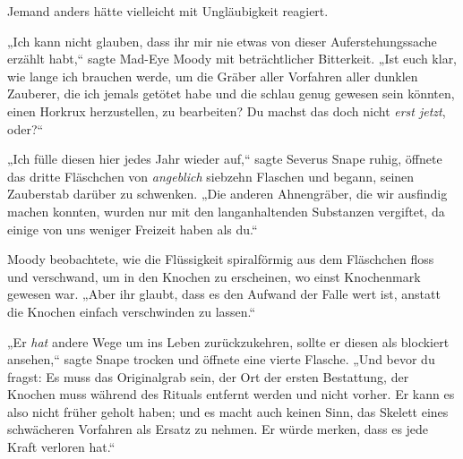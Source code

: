 Jemand anders hätte vielleicht mit Ungläubigkeit reagiert.

„Ich kann nicht glauben, dass ihr mir nie etwas von dieser Auferstehungssache erzählt habt,“ sagte Mad-Eye Moody mit beträchtlicher Bitterkeit. „Ist euch klar, wie lange ich brauchen werde, um die Gräber aller Vorfahren aller dunklen Zauberer, die ich jemals getötet habe und die schlau genug gewesen sein könnten, einen Horkrux herzustellen, zu bearbeiten? Du machst das doch nicht \emph{erst jetzt}, oder?“

„Ich fülle diesen hier jedes Jahr wieder auf,“ sagte Severus Snape ruhig, öffnete das dritte Fläschchen von \emph{angeblich} siebzehn Flaschen und begann, seinen Zauberstab darüber zu schwenken. „Die anderen Ahnengräber, die wir ausfindig machen konnten, wurden nur mit den langanhaltenden Substanzen vergiftet, da einige von uns weniger Freizeit haben als du.“

Moody beobachtete, wie die Flüssigkeit spiralförmig aus dem Fläschchen floss und verschwand, um in den Knochen zu erscheinen, wo einst Knochenmark gewesen war. „Aber ihr glaubt, dass es den Aufwand der Falle wert ist, anstatt die Knochen einfach verschwinden zu lassen.“

„Er \emph{hat} andere Wege um ins Leben zurückzukehren, sollte er diesen als blockiert ansehen,“ sagte Snape trocken und öffnete eine vierte Flasche. „Und bevor du fragst: Es muss das Originalgrab sein, der Ort der ersten Bestattung, der Knochen muss während des Rituals entfernt werden und nicht vorher. Er kann es also nicht früher geholt haben; und es macht auch keinen Sinn, das Skelett eines schwächeren Vorfahren als Ersatz zu nehmen. Er würde merken, dass es jede Kraft verloren hat.“

